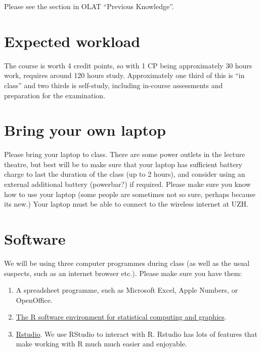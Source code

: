 \documentclass[
  letterpaper,
  8pt,
  a4paper]{book}
\begin{document}

Please see the section in OLAT ``Previous Knowledge''.

\section*{Expected workload}\label{expected-workload}


The course is worth 4 credit points, so with 1 CP being approximately 30
hours work, requires around 120 hours study. Approximately one third of
this is ``in class'' and two thirds is self-study, including in-course
assessments and preparation for the examination.

\section*{Bring your own laptop}\label{bring-your-own-laptop}


Please bring your laptop to class. There are some power outlets in the
lecture theatre, but best will be to make sure that your laptop has
sufficient battery charge to last the duration of the class (up to 2
hours), and consider using an external additional battery (powerbar?) if
required. Please make sure you know how to use your laptop (some people
are sometimes not so sure, perhaps because its new.) Your laptop must be
able to connect to the wireless internet at UZH.

\section*{Software}\label{software}


We will be using three computer programmes during class (as well as the
usual suspects, such as an internet browser etc.). Please make sure you
have them:

\begin{enumerate}
\def\labelenumi{\arabic{enumi}.}
\item
  A spreadsheet programme, such as Microsoft Excel, Apple Numbers, or
  OpenOffice.
\item
  \href{https://www.r-project.org}{The R software environment for
  statistical computing and graphics}.
\item
  \href{https://posit.co/downloads/}{Rstudio}. We use RStudio to
  interact with R. Rstudio has lots of features that make working with R
  much much easier and enjoyable.
\end{enumerate}
\end{document}
